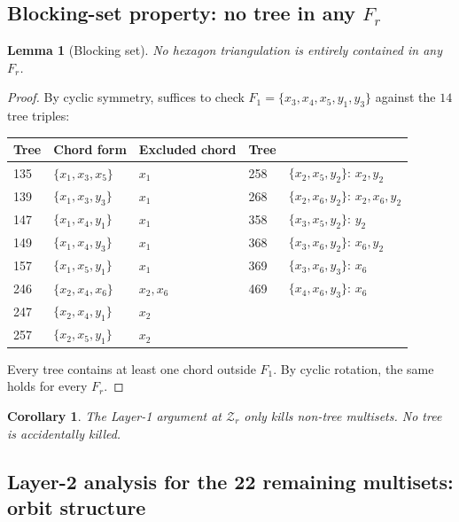 \documentclass[11pt]{article}
\newcommand{\Z}{\mathcal{Z}}
\newtheorem{lemma}{Lemma}
\newtheorem{corollary}{Corollary}
\theoremstyle{definition}
\begin{document}
\subsection{Blocking-set property: no tree in any \texorpdfstring{$F_r$}{F\_r}}
\label{sec:blocking-set}

\begin{lemma}[Blocking set]
\label{lem:blocking}
No hexagon triangulation is entirely contained in any $F_r$.
\end{lemma}

\begin{proof}
By cyclic symmetry, suffices to check $F_1 = \{x_3, x_4, x_5, y_1, y_3\}$
against the $14$ tree triples:
\begin{center}
\footnotesize
\begin{tabular}{l|l|l|l|l}
\toprule
Tree & Chord form & Excluded chord & Tree & \\
\midrule
135 & $\{x_1,x_3,x_5\}$ & $x_1$ & 258 & $\{x_2,x_5,y_2\}$: $x_2, y_2$ \\
139 & $\{x_1,x_3,y_3\}$ & $x_1$ & 268 & $\{x_2,x_6,y_2\}$: $x_2, x_6, y_2$\\
147 & $\{x_1,x_4,y_1\}$ & $x_1$ & 358 & $\{x_3,x_5,y_2\}$: $y_2$\\
149 & $\{x_1,x_4,y_3\}$ & $x_1$ & 368 & $\{x_3,x_6,y_2\}$: $x_6, y_2$\\
157 & $\{x_1,x_5,y_1\}$ & $x_1$ & 369 & $\{x_3,x_6,y_3\}$: $x_6$\\
246 & $\{x_2,x_4,x_6\}$ & $x_2, x_6$ & 469 & $\{x_4,x_6,y_3\}$: $x_6$\\
247 & $\{x_2,x_4,y_1\}$ & $x_2$ & & \\
257 & $\{x_2,x_5,y_1\}$ & $x_2$ & & \\
\bottomrule
\end{tabular}
\end{center}
Every tree contains at least one chord outside $F_1$. By cyclic rotation,
the same holds for every $F_r$.
\end{proof}

\begin{corollary}
The Layer-1 argument at $\Z_r$ only kills non-tree multisets. No tree is
accidentally killed.
\end{corollary}

\subsection{Layer-2 analysis for the 22 remaining multisets: orbit structure}
\label{sec:orbit-analysis}
\end{document}
